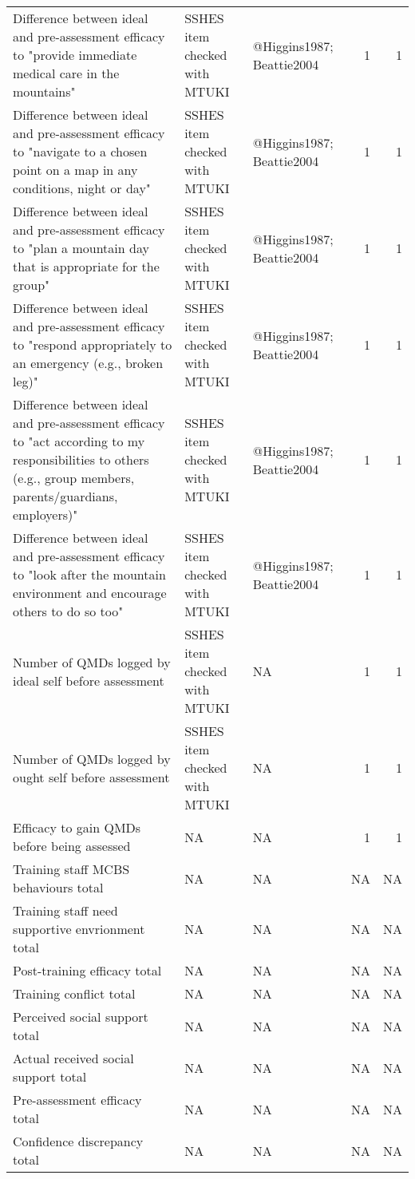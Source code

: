 \documentclass[a4paper,]{book}
\begin{document}
\begin{table}
\begin{tabular}[t]{lllrr}
Difference between ideal and pre-assessment efficacy to "provide immediate medical care in the mountains" & SSHES item checked with MTUKI & @Higgins1987; Beattie2004 & 1 & 1\\
\addlinespace
Difference between ideal and pre-assessment efficacy to "navigate to a chosen point on a map in any conditions, night or day" & SSHES item checked with MTUKI & @Higgins1987; Beattie2004 & 1 & 1\\
Difference between ideal and pre-assessment efficacy to "plan a mountain day that is appropriate for the group" & SSHES item checked with MTUKI & @Higgins1987; Beattie2004 & 1 & 1\\
Difference between ideal and pre-assessment efficacy to "respond appropriately to an emergency (e.g., broken leg)" & SSHES item checked with MTUKI & @Higgins1987; Beattie2004 & 1 & 1\\
Difference between ideal and pre-assessment efficacy to "act according to my responsibilities to others (e.g., group members, parents/guardians, employers)" & SSHES item checked with MTUKI & @Higgins1987; Beattie2004 & 1 & 1\\
Difference between ideal and pre-assessment efficacy to "look after the mountain environment and encourage others to do so too" & SSHES item checked with MTUKI & @Higgins1987; Beattie2004 & 1 & 1\\
\addlinespace
Number of QMDs logged by ideal self before assessment & SSHES item checked with MTUKI & NA & 1 & 1\\
Number of QMDs logged by ought self before assessment & SSHES item checked with MTUKI & NA & 1 & 1\\
Efficacy to gain QMDs before being assessed & NA & NA & 1 & 1\\
Training staff MCBS behaviours total & NA & NA & NA & NA\\
Training staff need supportive envrionment total & NA & NA & NA & NA\\
\addlinespace
Post-training efficacy total & NA & NA & NA & NA\\
Training conflict total & NA & NA & NA & NA\\
Perceived social support total & NA & NA & NA & NA\\
Actual received social support total & NA & NA & NA & NA\\
Pre-assessment efficacy total & NA & NA & NA & NA\\
\addlinespace
Confidence discrepancy total & NA & NA & NA & NA\\

\end{tabular}
\end{table}
\end{document}
